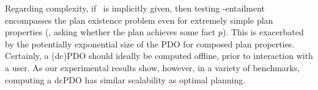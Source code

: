 Regarding complexity, if \plans\ is implicitly given, then testing
\plans-entailment encompasses the plan existence problem even for
extremely simple plan properties (\eg, asking whether the plan
achieves some fact $p$).
%
%
%
%
This is exacerbated by the potentially exponential size of the PDO for
composed plan properties. Certainly, a (dc)PDO should ideally be
computed offline, prior to interaction with a user. As our
experimental results show, however, in a variety of benchmarks,
computing a dcPDO has similar scalability as optimal planning.


%
%







